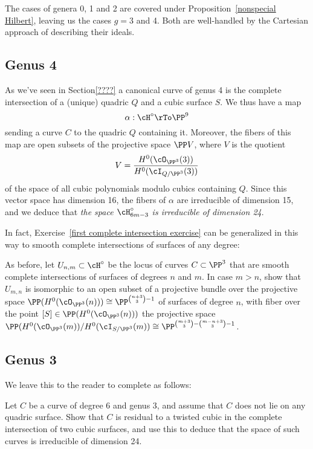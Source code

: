 The cases of genera 0, 1 and 2 are covered under Proposition~\ref{nonspecial Hilbert}, leaving us the cases $g = 3$ and 4. Both are well-handled by the Cartesian approach of describing their ideals.

\subsection{Genus 4}

As we've seen in Section\ref{????} a canonical curve of genus 4 is the complete intersection of a (unique) quadric $Q$ and a cubic surface $S$. We thus have a map
$$
\alpha : \cH^\circ \rTo \PP^9
$$
sending a curve $C$ to the quadric $Q$ containing it. Moreover, the fibers of this map are open subsets of the projective space $\PP V$, where $V$ is the quotient
$$
V = \frac{H^0(\cO_{\PP^3}(3))}{H^0(\cI_{Q/\PP^3}(3))}
$$
of the space of all cubic polynomials modulo cubics containing $Q$. Since this vector space has dimension 16, the fibers of $\alpha$ are irreducible of dimension 15, and we deduce that \emph{the space $\cH^\circ_{6m-3}$ is irreducible of dimension 24}.

In fact, Exercise~\ref{first complete intersection exercise} can be generalized in this way to smooth complete intersections of surfaces of any degree:

\begin{exercise}\label{second complete intersection exercise}
As before, let $U_{n,m} \subset \cH^\circ$ be the locus of curves $C \subset \PP^3$ that are smooth complete intersections of surfaces of degrees $n$ and $m$.
 In case $m > n$, show that $U_{m,n}$ is isomorphic to an open subset of a projective bundle over the projective space $\PP(H^0(\cO_{\PP^3}(n))) \cong \PP^{\binom{n+3}{3}-1}$ of surfaces of degree $n$, with fiber over the point $[S] \in \PP(H^0(\cO_{\PP^3}(n)))$ the projective space $\PP(H^0(\cO_{\PP^3}(m))/H^0(\cI_{S/\PP^3}(m)) \cong \PP^{\binom{m+3}{3} - \binom{m-n+3}{3} - 1}$.
\end{exercise}


\subsection{Genus 3}
We leave this to the reader to complete as follows:

\begin{exercise}
Let $C$ be a curve of degree 6 and genus 3, and assume that $C$ does not lie on any quadric surface. Show that $C$ is residual to a twisted cubic in the complete intersection of two cubic surfaces, and use this to deduce that the space of such curves is irreducible of dimension 24.
\end{exercise}


